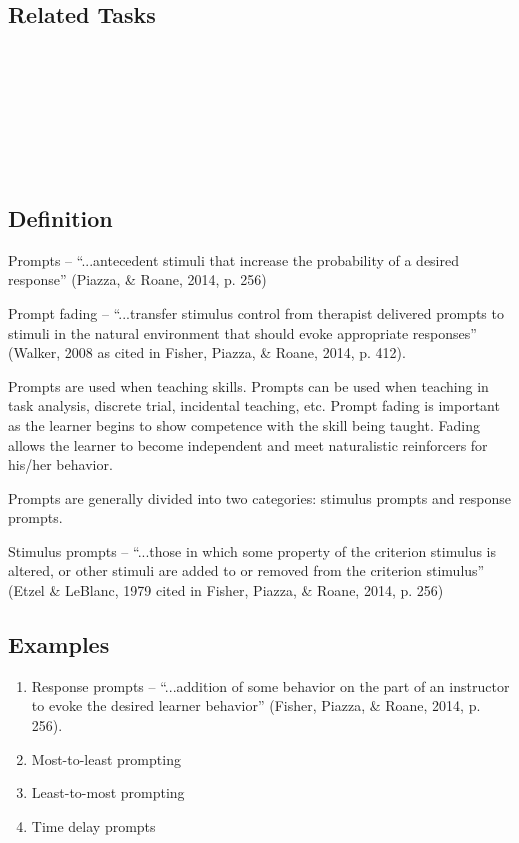 \subsection{Related Tasks}
\fourhOne{}\\
\fourjOne{}\\
\fourkThree{}\\
\fourkFour{}\\
\fourkSix{}\\
\fourkEight{}\\
%
\clearpage \section{\fourdThree{}}
\subsection{Definition}
Prompts – ``...antecedent stimuli that increase the probability of a desired response'' (Piazza, \& Roane, 2014, p. 256)

Prompt fading – ``...transfer stimulus control from therapist delivered prompts to stimuli in the natural environment that should evoke appropriate responses'' (Walker, 2008 as cited in Fisher, Piazza, \& Roane, 2014, p. 412).

Prompts are used when teaching skills. Prompts can be used when teaching in task analysis, discrete trial, incidental teaching, etc. Prompt fading is important as the learner begins to show competence with the skill being taught. Fading allows the learner to become independent and meet naturalistic reinforcers for his/her behavior.

Prompts are generally divided into two categories: stimulus prompts and response prompts.

Stimulus prompts – ``...those in which some property of the criterion stimulus is altered, or other stimuli are added to or removed from the criterion stimulus'' (Etzel \& LeBlanc, 1979 cited in Fisher, Piazza, \& Roane, 2014, p. 256)
\subsection{Examples}
\begin{enumerate}
\item Response prompts – ``...addition of some behavior on the part of an instructor to evoke the desired learner behavior'' (Fisher, Piazza, \& Roane, 2014, p. 256).
\item Most-to-least prompting
\item Least-to-most prompting
\item Time delay prompts
\end{enumerate}
%
